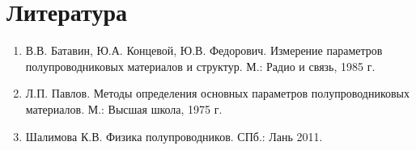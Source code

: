 \section{Литература}
\begin{enumerate}
\item В.В. Батавин, Ю.А. Концевой, Ю.В. Федорович. Измерение параметров полупроводниковых материалов и структур. М.: Радио и связь, 1985 г.
\item Л.П. Павлов. Методы определения основных параметров полупроводниковых материалов. М.: Высшая школа, 1975 г.
\item Шалимова К.В. Физика полупроводников. СПб.: Лань 2011.
\end{enumerate}